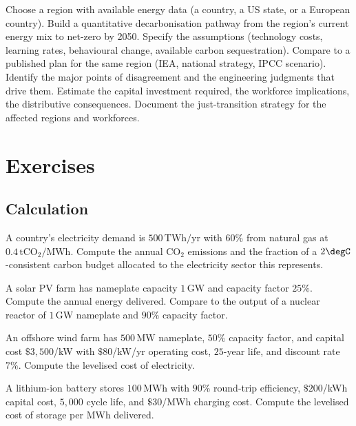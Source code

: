 \begin{project}
Choose a region with available energy data (a country, a US state, or a European country). Build a quantitative decarbonisation pathway from the region's current energy mix to net-zero by 2050. Specify the assumptions (technology costs, learning rates, behavioural change, available carbon sequestration). Compare to a published plan for the same region (IEA, national strategy, IPCC scenario). Identify the major points of disagreement and the engineering judgments that drive them. Estimate the capital investment required, the workforce implications, the distributive consequences. Document the just-transition strategy for the affected regions and workforces.
\end{project}

\section{Exercises}

\subsection*{Calculation}

\begin{exercise}
A country's electricity demand is $500\,\text{TWh/yr}$ with $60\%$ from natural gas at $0.4\,\text{tCO}_2/\text{MWh}$. Compute the annual CO$_2$ emissions and the fraction of a $2\degC$-consistent carbon budget allocated to the electricity sector this represents.
\end{exercise}

\begin{exercise}
A solar PV farm has nameplate capacity $1\,\text{GW}$ and capacity factor $25\%$. Compute the annual energy delivered. Compare to the output of a nuclear reactor of $1\,\text{GW}$ nameplate and $90\%$ capacity factor.
\end{exercise}

\begin{exercise}
An offshore wind farm has $500\,\text{MW}$ nameplate, $50\%$ capacity factor, and capital cost $\$3{,}500$/kW with $\$80$/kW/yr operating cost, $25$-year life, and discount rate $7\%$. Compute the levelised cost of electricity.
\end{exercise}

\begin{exercise}
A lithium-ion battery stores $100\,\text{MWh}$ with $90\%$ round-trip efficiency, $\$200$/kWh capital cost, $5{,}000$ cycle life, and $\$30$/MWh charging cost. Compute the levelised cost of storage per MWh delivered.
\end{exercise}

